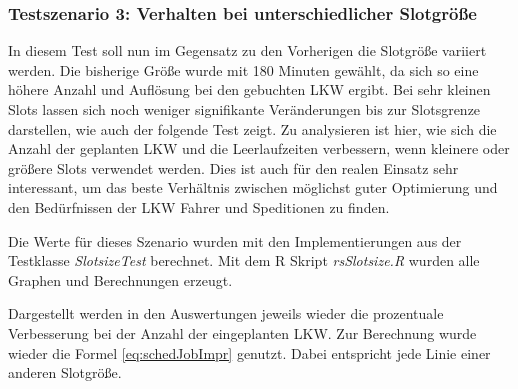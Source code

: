 \subsubsection{Testszenario 3: Verhalten bei unterschiedlicher Slotgröße}

In diesem Test soll nun im Gegensatz zu den Vorherigen die Slotgröße variiert werden. Die bisherige Größe wurde mit 180 Minuten gewählt, da sich so eine höhere Anzahl und \glqq{}Auflösung\grqq{} bei den gebuchten LKW ergibt. Bei sehr kleinen Slots lassen sich noch weniger signifikante Veränderungen bis zur Slotsgrenze darstellen, wie auch der folgende Test zeigt.  Zu analysieren ist hier, wie sich die Anzahl der geplanten LKW und die Leerlaufzeiten verbessern, wenn kleinere oder größere Slots verwendet werden. Dies ist auch für den realen Einsatz sehr interessant, um das beste Verhältnis zwischen möglichst guter Optimierung und den Bedürfnissen der LKW Fahrer und Speditionen zu finden.

Die Werte für dieses Szenario wurden mit den Implementierungen aus der Testklasse \textit{SlotsizeTest} berechnet. Mit dem R Skript \textit{rsSlotsize.R}  wurden alle Graphen und Berechnungen erzeugt.

Dargestellt werden in den Auswertungen jeweils wieder die prozentuale Verbesserung bei der Anzahl der eingeplanten LKW. Zur Berechnung wurde wieder die Formel \ref{eq:schedJobImpr} genutzt. Dabei entspricht jede Linie einer anderen Slotgröße.

